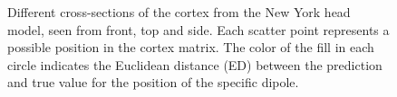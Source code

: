 \documentclass[a4paper, UKenglish, 11pt]{uiomaster}
\begin{document}
\begin{figure}[ht]
    \caption{Different cross-sections of the cortex from the New York head model, seen from front, top and side. Each scatter point represents a possible position in the cortex matrix. The color of the fill in each circle indicates the Euclidean distance (ED) between the prediction and true value for the position of the specific dipole.}
    \label{fig:MED_crossections}
\end{figure}
\end{document}
